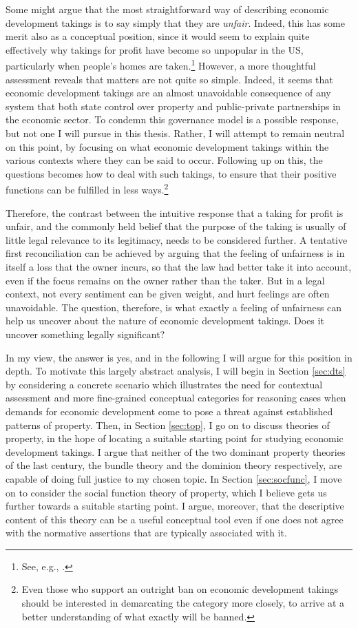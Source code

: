 Some might argue that the most straightforward way of describing economic development takings is to say simply that they are {\it unfair}. Indeed, this has some merit also as a conceptual position, since it would seem to explain quite effectively why takings for profit have become so unpopular in the US, particularly when people's homes are taken.\footnote{See, e.g., \cite[742-748]{nadler08}.}  However, a more thoughtful assessment reveals that matters are not quite so simple. Indeed, it seems that economic development takings are an almost unavoidable consequence of any system that  both state control over property and public-private partnerships in the economic sector. To condemn this governance model is a possible response, but not one I will pursue in this thesis. Rather, I will attempt to remain neutral on this point, by focusing on what  economic development takings within the various contexts where they can be said to occur. Following up on this, the questions becomes how to deal with such takings, to ensure that their positive functions can be fulfilled in less  ways.\footnote{Even those who support an outright ban on economic development takings should be interested in demarcating the category more closely, to arrive at a better understanding of what exactly will be banned.}

Therefore, the contrast between the intuitive response that a taking for profit is unfair, and the commonly held belief that the purpose of the taking is usually of little legal relevance to its legitimacy,  needs to be considered further. A tentative first reconciliation can be achieved by arguing that the feeling of unfairness is in itself a loss that the owner incurs, so that the law had better take it into account, even if the focus remains on the owner rather than the taker. But in a legal context, not every sentiment can be given weight, and hurt feelings are often unavoidable. The question, therefore, is what exactly a feeling of unfairness can help us uncover about the nature of economic development takings. Does it uncover something legally significant?

In my view, the answer is yes, and in the following I will argue for this position in depth. To motivate this largely abstract analysis, I will begin in Section \ref{sec:dts} by considering a concrete scenario which illustrates the need for contextual assessment and more fine-grained conceptual categories for reasoning  cases when demands for economic development come to pose a threat against established patterns of property. Then, in Section \ref{sec:top}, I go on to discuss theories of property, in the hope of locating a suitable starting point for studying economic development takings. I argue that neither of the two dominant property theories of the last century, the bundle theory and the dominion theory respectively, are capable of doing full justice to my chosen topic. In Section \ref{sec:socfunc}, I move on to consider the social function theory of property, which I believe gets us further towards a suitable starting point. I argue, moreover, that the descriptive content of this theory can be a useful conceptual tool even if one does not agree with the normative assertions that are typically associated with it. 

